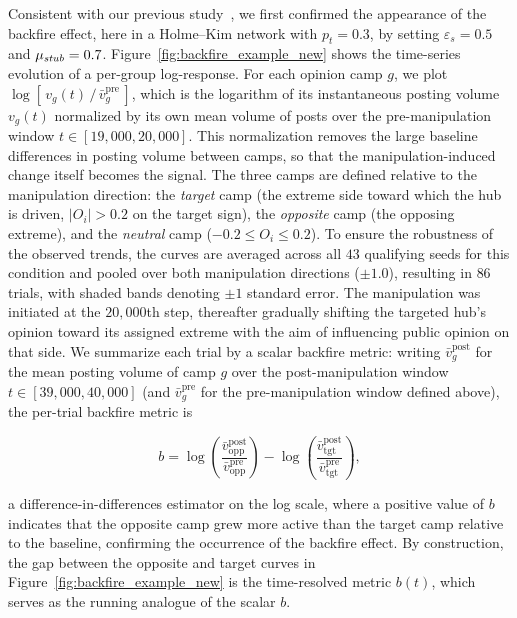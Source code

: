 \documentclass[pdflatex,sn-mathphys-num]{sn-jnl}%
\theoremstyle{thmstyleone}%
\theoremstyle{thmstyletwo}%
\theoremstyle{thmstylethree}%
\def\Stubbornness{\mu_{\it stub}}
\def\ThofOpPreval{\varepsilon_s}
\begin{document}
Consistent with our previous study~\cite{Takeda2026}, we first confirmed the appearance of the backfire effect, here in a Holme--Kim network with $p_t = 0.3$, by setting $\ThofOpPreval=0.5$ and $\Stubbornness=0.7$.
Figure~\ref{fig:backfire_example_new} shows the time-series evolution
of a per-group log-response. For each opinion camp $g$,
we plot $\log\!\left[\,v_g(t)\,/\,\bar v_g^{\text{pre}}\,\right]$, which is
the logarithm of its instantaneous posting volume $v_g(t)$
normalized by its own mean volume of posts over the pre-manipulation
window $t \in [19{,}000, 20{,}000]$. This normalization removes
the large baseline differences in posting volume between camps,
so that the manipulation-induced change itself becomes the signal.
The three camps are defined relative to the manipulation direction:
the \emph{target} camp (the extreme side toward which the hub is
driven, $|O_i| > 0.2$ on the target sign), the \emph{opposite} camp
(the opposing extreme), and the \emph{neutral}
camp ($-0.2 \le O_i \le 0.2$). To ensure the robustness of the observed
trends, the curves are averaged across all $43$ qualifying
seeds for this condition and pooled over both manipulation directions ($\pm1.0$),
resulting in $86$ trials, with shaded bands denoting $\pm1$ standard error.
The manipulation was initiated at the $20{,}000$th step,
thereafter gradually shifting the targeted hub's opinion
toward its assigned extreme with the aim of influencing public opinion
on that side. We summarize each trial by a scalar backfire metric: writing
$\bar{v}^{\text{post}}_{g}$ for the mean posting volume of camp $g$ over the
post-manipulation window $t \in [39{,}000, 40{,}000]$ (and $\bar{v}^{\text{pre}}_{g}$
for the pre-manipulation window defined above), the per-trial backfire metric is

\begin{equation}\label{eq:backfire}
  b = \log\!\left(\frac{\bar{v}^{\text{post}}_{\text{opp}}}{\bar{v}^{\text{pre}}_{\text{opp}}}\right)
    - \log\!\left(\frac{\bar{v}^{\text{post}}_{\text{tgt}}}{\bar{v}^{\text{pre}}_{\text{tgt}}}\right),
\end{equation}

a difference-in-differences estimator on the log scale, where a positive value of
$b$ indicates that the opposite camp grew more active than the target camp
relative to the baseline, confirming the occurrence of the backfire effect. By construction, the
gap between the opposite and target curves in
Figure~\ref{fig:backfire_example_new} is the time-resolved metric $b(t)$, which serves as the
running analogue of the scalar $b$.
\end{document}

